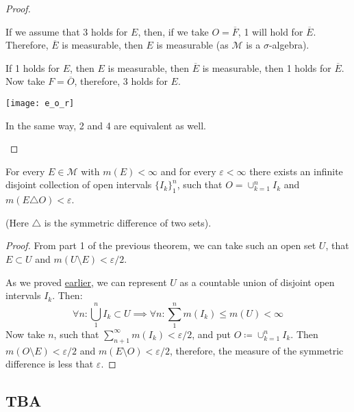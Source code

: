 \begin{proof}
\begin{itemize}
{            If we assume that 3 holds for $E$, then, if we take $O = \overline{F}$,
            1 will hold for $\overline{E}$.
            Therefore, $\overline{E}$ is measurable, then $E$ is measurable
            (as $\mathcal{M}$ is a $\sigma$-algebra).

            If 1 holds for $E$, then $E$ is measurable, then $\overline{E}$ is measurable, then 1 holds for 
            $\overline{E}$. Now take $F = \overline{O}$, therefore, 3 holds for $E$.

            \begin{figure*}[h]
                \centering
                \texttt{[image: e\_o\_r]}
            \end{figure*}

            In the same way, 2 and 4 are equivalent as well.
        }
    \end{itemize}
\end{proof}

\begin{theorem}
    For every $E \in \mathcal{M}$ with $m(E) < \infty$ and for every
    $\varepsilon < \infty$ there exists an infinite disjoint collection of open intervals
    $\{I_k\}_1^n$, such that $O = \cup_{k=1}^n I_k$ and $m(E \triangle O) < \varepsilon$.

    (Here $\triangle$ is the symmetric difference of two sets).
\end{theorem}
\begin{proof}
    From part 1 of the previous theorem,
    we can take such an open set $U$, that $E \subset U$ and $m(U \setminus E) < \varepsilon / 2$. 
    
    As we proved \hyperref[prop:bIsSmallestSigmaAlgebra]{earlier}, 
    we can represent $U$ as a countable union of disjoint open intervals $I_k$. Then:
    \[
        \forall n: \bigcup_1^n I_k \subset U \implies \forall n:
        \sum_1^n m(I_k) \le m(U) < \infty
    \]
    Now take $n$, such that $\sum_{n+1}^\infty m(I_k) < \varepsilon / 2$, and put
    $O \coloneqq \cup_{k=1}^n I_k$.
    Then $m(O \setminus E) < \varepsilon / 2$ and $m(E \setminus O) < \varepsilon / 2$,
    therefore, the measure of the symmetric difference is less that $\varepsilon$.
\end{proof}

\subsection{TBA}

